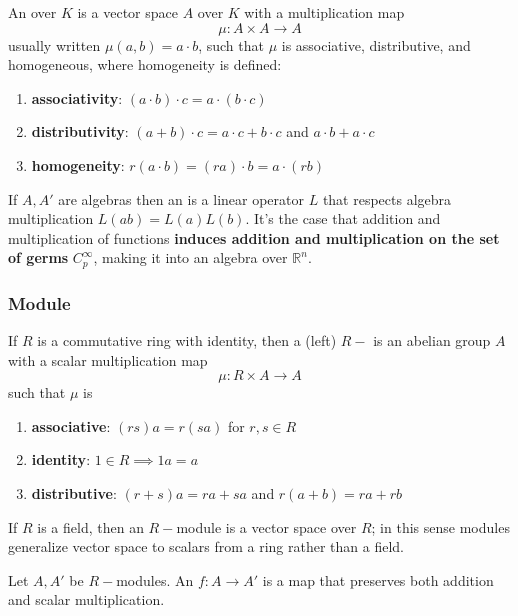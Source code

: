 An  over  \(K\) is a vector space \(A\) over \(K\) with a multiplication map
%
\begin{equation}
    \mu\colon A \times A \rightarrow A
\end{equation}
%
usually written \(\mu(a,b)=a \cdot b\), such that \(\mu\) is associative, distributive, and homogeneous, where homogeneity is defined:
%
\begin{enumerate}
    \item \textbf{associativity}: \((a\cdot b)\cdot c = a \cdot (b \cdot c) \)
    \item \textbf{distributivity}: \((a+b)\cdot c = a\cdot c + b \cdot c\) and \(a\cdot b + a \cdot c\)
    \item \textbf{homogeneity}: \(r(a\cdot b) = (ra)\cdot b = a\cdot (rb)\)
\end{enumerate}
%
If \(A, A'\) are algebras then an  is a linear operator \(L\) that respects algebra multiplication \(L(ab) = L(a)L(b)\).
%
It's the case that addition and multiplication of functions \textbf{induces addition and multiplication on the set of germs} \(C_p^\infty\), making it into an algebra over \(\mathbb{R}^n\).

\subsubsection{Module}

If \(R\) is a commutative ring with identity, then a (left) \(R-\) is an abelian group \(A\) with a scalar multiplication map
%
\begin{equation}
    \mu \colon R\times A \rightarrow A
\end{equation}
%
such that \(\mu\) is
%
\begin{enumerate}
    \item \textbf{associative}: \((rs)a = r (sa)\) for \(r,s \in R\)
    \item \textbf{identity}: \(1 \in R \implies 1a=a\)
    \item \textbf{distributive}: \((r+s)a = ra + sa\) and \(r(a+b) = ra + rb\)
\end{enumerate}
%
If \(R\) is a field, then an \(R-\)module is a vector space over \(R\); in this sense modules generalize vector space to scalars from a ring rather than a field.

Let \(A, A'\) be \(R-\)modules. An  \(f\colon A \rightarrow A'\) is a map that preserves both addition and scalar multiplication.


